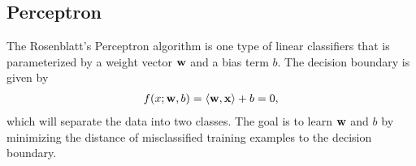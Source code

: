 



\subsection{Perceptron}

The Rosenblatt's Perceptron algorithm \citep{Rosenblatt58,Rosenblatt62} is one type of linear classifiers that is parameterized by a weight vector $\mathbf {w}$ and a bias term $b$. 
The decision boundary is given by 
\begin{align*}
	f(x;\mathbf {w},b) = \langle \mathbf {w}, \mathbf {x} \rangle + b =0,
\end{align*}
which will separate the data into two classes.
The goal is to learn $\mathbf {w}$ and $b$ by minimizing the distance of misclassified training examples to the decision boundary.

